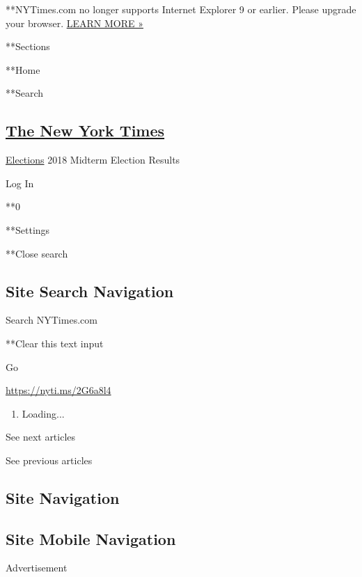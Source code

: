  **NYTimes.com no longer supports Internet Explorer 9 or earlier. Please
upgrade your browser.
\href{http://www.nytimes3xbfgragh.onion/content/help/site/ie9-support.html}{LEARN
MORE »}

**Sections

**Home

**Search

\hypertarget{the-new-york-times}{%
\subsection{\texorpdfstring{\href{http://www.nytimes3xbfgragh.onion/}{The
New York Times}}{The New York Times}}\label{the-new-york-times}}

 \href{/news-event/2020-election}{Elections} \textbar{}2018 Midterm
Election Results

Log In

**0

**Settings

**Close search

\hypertarget{site-search-navigation}{%
\subsection{Site Search Navigation}\label{site-search-navigation}}

Search NYTimes.com

**Clear this text input

Go

\url{https://nyti.ms/2G6a8l4}

\begin{enumerate}
\def\labelenumi{\arabic{enumi}.}
\item
  Loading...
\end{enumerate}

See next articles

See previous articles

\hypertarget{site-navigation}{%
\subsection{Site Navigation}\label{site-navigation}}

\hypertarget{site-mobile-navigation}{%
\subsection{Site Mobile Navigation}\label{site-mobile-navigation}}

Advertisement

